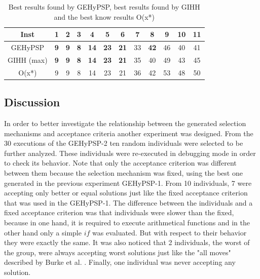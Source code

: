 \documentclass[conference]{IEEEtran}
\begin{document}

\begin{table}[]
	\centering
	\caption{Best results found by GEHyPSP, best results found by GIHH and the best know results O(x*)}
	\label{tab:gihhandbhlh}
	\begin{tabular}{cccccccccccc}
		Inst         & 1 & 2 & 3 & 4  & 5  & 6  & 7  & 8  & 9  & 10 & 11 \\ \hline
		GEHyPSP  & \textbf{9} & \textbf{9} & \textbf{8} & \textbf{14} & \textbf{23} & \textbf{21} & 33 & \textbf{42} & 46 & 40 & 41 \\ \hline
		GIHH (max)   & \textbf{9} & \textbf{9} & \textbf{8} & \textbf{14} & \textbf{23} & \textbf{21} & 35 & 40 & 49 & 43 & 45 \\ \hline
		O(x*)        & 9 & 9 & 8 & 14 & 23 & 21 & 36 & 42 & 53 & 48 & 50
	\end{tabular}
\end{table}


\subsection{Discussion}

In order to better investigate the relationship between the generated selection mechanisms and acceptance criteria another experiment was designed. From the 30 executions of the GEHyPSP-2 ten random individuals were selected to be further analyzed. These individuals were re-executed in debugging mode in order to check its behavior. Note that only the acceptance criterion was different between them because the selection mechanism was fixed, using the best one generated in the previous experiment GEHyPSP-1. From 10 individuals, 7 were accepting only better or equal solutions just like the fixed acceptance criterion that was used in the GEHyPSP-1. The difference between the individuals and a fixed acceptance criterion was that individuals were slower than the fixed, because in one hand, it is required to execute arithmetical functions and in the other hand only a simple $if$ was evaluated. But with respect to their behavior they were exactly the same. It was also noticed that 2 individuals, the worst of the group, were always accepting worst solutions just like the "all moves" described by Burke et al. \cite{burke2013hyper}. Finally, one individual was never accepting any solution. 
\end{document}
